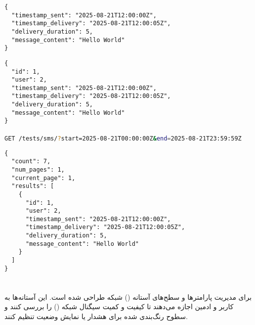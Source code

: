\documentclass{report}
\begin{document}
\subsection{}
\subsubsection{}
\begin{latin}
\begin{lstlisting}[style=jsonstyle]
{
  "timestamp_sent": "2025-08-21T12:00:00Z",
  "timestamp_delivery": "2025-08-21T12:00:05Z",
  "delivery_duration": 5,
  "message_content": "Hello World"
}
\end{lstlisting}
\end{latin}
\textbf{}
\begin{latin}
\begin{lstlisting}[style=jsonstyle]
{
  "id": 1,
  "user": 2,
  "timestamp_sent": "2025-08-21T12:00:00Z",
  "timestamp_delivery": "2025-08-21T12:00:05Z",
  "delivery_duration": 5,
  "message_content": "Hello World"
}
\end{lstlisting}
\end{latin}

\subsubsection{}
\begin{latin}
\begin{lstlisting}[style=jsonstyle, language=bash]
GET /tests/sms/?start=2025-08-21T00:00:00Z&end=2025-08-21T23:59:59Z
\end{lstlisting}
\end{latin}
\textbf{}
\begin{latin}
\begin{lstlisting}[style=jsonstyle]
{
  "count": 7,
  "num_pages": 1,
  "current_page": 1,
  "results": [
    {
      "id": 1,
      "user": 2,
      "timestamp_sent": "2025-08-21T12:00:00Z",
      "timestamp_delivery": "2025-08-21T12:00:05Z",
      "delivery_duration": 5,
      "message_content": "Hello World"
    }
  ]
}
\end{lstlisting}
\end{latin}

\chapter{}
 برای مدیریت پارامترها و سطح‌های آستانه () شبکه طراحی شده است. این آستانه‌ها به کاربر و ادمین اجازه می‌دهند تا کیفیت و کمیت سیگنال شبکه () را بررسی کنند و سطوح رنگ‌بندی شده برای هشدار یا نمایش وضعیت تنظیم کنند.
\end{document}
